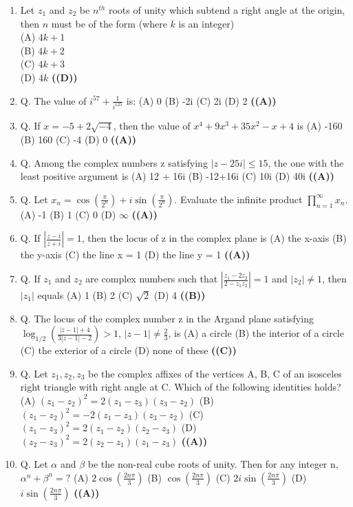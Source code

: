\documentclass{article}
\begin{document}
\begin{enumerate}
\item Let $z_1$ and $z_2$ be $n^{th}$ roots of unity which subtend a right angle at the origin, then $n$ must be of the form (where $k$ is an integer)\\
(A) $4k +1$\\
(B) $4k +2$\\
(C) $4k+3$\\
(D) $4k$ \hfill \textbf{((D))}
\item Q. The value of $i^{57} + \frac{1}{i^{125}}$ is: (A) 0 (B) -2i (C) 2i (D) 2 \hfill \textbf{((A))}
\item Q. If $x = -5 + 2\sqrt{-4}$, then the value of $x^4 + 9x^3 + 35x^2 - x + 4$ is (A) -160 (B) 160 (C) -4 (D) 0 \hfill \textbf{((A))}
\item Q. Among the complex numbers z satisfying $|z - 25i| \le 15$, the one with the least positive argument is (A) 12 + 16i (B) -12+16i (C) 10i (D) 40i \hfill \textbf{((A))}
\item Q. Let $x_n = \cos(\frac{\pi}{2^n}) + i \sin(\frac{\pi}{2^n})$. Evaluate the infinite product $\prod_{n=1}^{\infty} x_n$. (A) -1 (B) 1 (C) 0 (D) $\infty$ \hfill \textbf{((A))}
\item Q. If $|\frac{z-i}{z+i}| = 1$, then the locus of z in the complex plane is (A) the x-axis (B) the y-axis (C) the line x = 1 (D) the line y = 1 \hfill \textbf{((A))}
\item Q. If $z_1$ and $z_2$ are complex numbers such that $|\frac{z_1 - 2z_2}{2 - z_1z_2}| = 1$ and $|z_2| \ne 1$, then $|z_1|$ equals (A) 1 (B) 2 (C) $\sqrt{2}$ (D) 4 \hfill \textbf{((B))}
\item Q. The locus of the complex number z in the Argand plane satisfying $\log_{1/2}(\frac{|z-1|+4}{3|z-1|-2}) > 1$, $|z-1| \ne \frac{2}{3}$, is (A) a circle (B) the interior of a circle (C) the exterior of a circle (D) none of these \hfill \textbf{((C))}
\item Q. Let $z_1, z_2, z_3$ be the complex affixes of the vertices A, B, C of an isosceles right triangle with right angle at C. Which of the following identities holds? (A) $(z_1-z_2)^2 = 2(z_1-z_3) (z_3-z_2)$ (B) $(z_1-z_2)^2 = -2(z_1-z_3) (z_3-z_2)$ (C) $(z_1-z_3)^2 = 2(z_1-z_2) (z_2-z_3)$ (D) $(z_2-z_3)^2 = 2 (z_2-z_1) (z_1-z_3)$ \hfill \textbf{((A))}
\item Q. Let $\alpha$ and $\beta$ be the non-real cube roots of unity. Then for any integer n, $\alpha^n + \beta^n = ?$ (A) $2\cos(\frac{2n\pi}{3})$ (B) $\cos(\frac{2n\pi}{3})$ (C) $2i\sin(\frac{2n\pi}{3})$ (D) $i\sin(\frac{2n\pi}{3})$ \hfill \textbf{((A))}

\end{enumerate}
\end{document}
